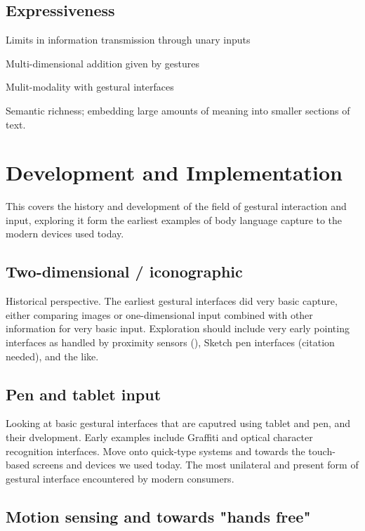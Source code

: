 \subsection{Expressiveness} 


Limits in information transmission through unary inputs

Multi-dimensional addition given by gestures

Mulit-modality with gestural interfaces

Semantic richness; embedding large amounts of meaning into smaller sections of text.

\section{Development and Implementation}

This covers the history and development of the field of gestural interaction and input, exploring it form the earliest examples of body language capture to the modern devices used today.

\subsection{Two-dimensional / iconographic}

Historical perspective. The earliest gestural interfaces did very basic capture, either comparing images or one-dimensional input combined with other information for very basic input. Exploration should include very early pointing interfaces as handled by proximity sensors (\cite{Bolt1980}), Sketch pen interfaces (citation needed), and the like.

\subsection{Pen and tablet input}

Looking at basic gestural interfaces that are caputred using tablet and pen, and their dvelopment. Early examples include Graffiti and optical character recognition interfaces. Move onto quick-type systems and towards the touch-based screens and devices we used today. The most unilateral and present form of gestural interface encountered by modern consumers.

\subsection{Motion sensing and towards "hands free"}

